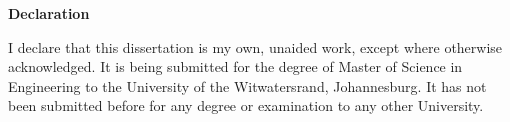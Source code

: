 \documentclass[MScDiss,altheaders,colorlinks,a4paper]{wits-eie-thesis}
\begin{document}
%		
%		
%		
%		
%		
%	
%		
%		
%		
%		
%		
%		
%		

\clearpage
{}
\vspace*{50pt}
{ \raggedright \huge \bfseries Declaration \par
	\nobreak
	\vskip 40pt
}

I declare that this dissertation is my own, unaided work, except where otherwise acknowledged. It is being submitted for the degree of Master of Science in Engineering to the University of the Witwatersrand, Johannesburg. It has not been submitted before for any degree or examination to any other University.
\end{document}
